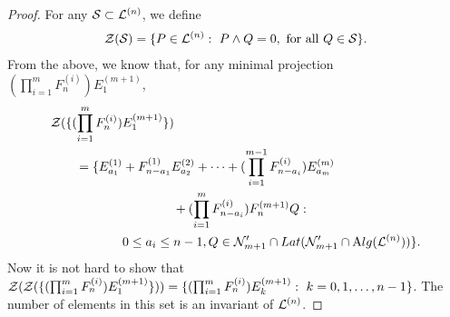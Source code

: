 \begin{proof}
For any $\mathcal S \subset \mathcal L^{(n)}$, we define
\begin{align*}
\mathcal Z(\mathcal S) = \{P \in
\mathcal L^{(n)} :\  P \wedge Q = 0, \ {\rm for\ all\ } Q \in \mathcal S \}.
\end{align*}
From
the above, we know that, for any minimal projection $(\prod_{i =
1}^{m}F_{n}^{(i)}) E_{1}^{(m+1)}$,
\begin{align*}
\mathcal Z(\{(\prod_{i = 1}^{m}F_{n}^{(i)})& E_{1}^{(m+1)} \})\cr =
\{E_{a_{1}}^{(1)} &+ F_{n-a_{1}}^{(1)}E_{a_{2}}^{(2)} + \cdots +
(\prod_{i=1}^{m-1}F_{n-a_{i}}^{(i)})E_{a_{m}}^{(m)}\\
& \qquad \qquad +(\prod_{i=1}^{m}F_{n-a_{i}}^{(i)})F_{n}^{(m+1)}Q: \cr &  0 \leq
a_{i} \leq n-1, Q \in {\mathcal N}_{m+1}' \cap Lat({\mathcal N}_{m+1}' \cap
\mathrm Alg(\mathcal L^{(n)}))\}.
\end{align*}
Now it is not hard to show that $\mathcal Z(\mathcal Z(\{(\prod_{i =
1}^{m}F_{n}^{(i)})E_{1}^{(m+1)} \})) = \{ (\prod_{i =
1}^{m}F_{n}^{(i)})E_{k}^{(m+1)}:\  k = 0, 1, \ldots, n-1 \}$. The
number of elements in this set is an invariant of
$\mathcal L^{(n)}$.
\end{proof}


















